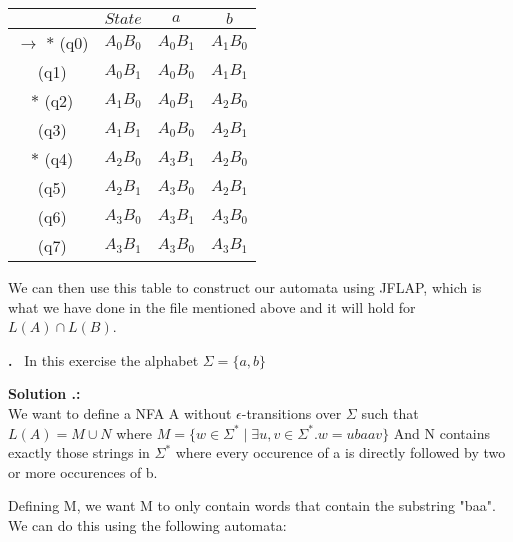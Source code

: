 \documentclass{article}
\newcounter{problem}
\newcounter{solution}
\newcommand\Problem{%
  \stepcounter{problem}%
  \textbf{\theproblem.}~%
  \setcounter{solution}{0}%
}
\newcommand\ASolution{%
  \stepcounter{solution}%
  \textbf{Solution \theproblem.\thesolution:}\\%
}
\begin{document}
\begin{table}[h!]
\centering
 \begin{tabular}{||c c c c||} 
 \hline
 & $State$ & $a$ & $b$ \\ [0.5ex] 
 \hline\hline
 $\rightarrow$ $*$ (q0) & $A_0B_0$ & $A_0B_1$ & $A_1B_0$ \\ 
    \hfill          (q1) & $A_0B_1$ & $A_0B_0$ & $A_1B_1$ \\
    \hfill $*$ (q2) & $A_1B_0$ & $A_0B_1$ & $A_2B_0$ \\
    \hfill           (q3) & $A_1B_1$ & $A_0B_0$ & $A_2B_1$\\
    \hfill $*$ (q4) & $A_2B_0$ & $A_3B_1$ & $A_2B_0$ \\
    \hfill           (q5) & $A_2B_1$ & $A_3B_0$ & $A_2B_1$ \\
    \hfill           (q6) & $A_3B_0$ & $A_3B_1$ & $A_3B_0$ \\
    \hfill           (q7) & $A_3B_1$ & $A_3B_0$ & $A_3B_1$ \\[1ex] 
 \hline
 \end{tabular}
\end{table}
\begin{center}
  We can then use this table to construct our automata using JFLAP, which is what we have done in the file mentioned above and it will hold for $L(A) \cap L(B)$.
\end{center} 
\newpage
\Problem In this exercise the alphabet $\Sigma = \{a,b\}$

\ASolution We want to define a NFA A without 
$\epsilon$-transitions over $\Sigma$ such that $L(A) = M \cup 
N$ where $M=\{w \in \Sigma^* \mid \exists u,v \in \Sigma^*. w =
ubaav\}$ And N contains exactly those strings in $\Sigma^*$ 
where every occurence of a is directly followed by two or more 
occurences of b.

Defining M, we want M to only contain words that contain the substring "baa". 
We can do this using the following automata:

\begin{center}
\end{center}
\end{document}
